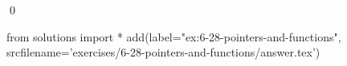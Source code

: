 
\begin{ex}
  \label{ex:6-28-pointers-and-functions}
  
  \qed
\end{ex}
\begin{python0}
from solutions import *
add(label="ex:6-28-pointers-and-functions",
    srcfilename='exercises/6-28-pointers-and-functions/answer.tex')
\end{python0}
